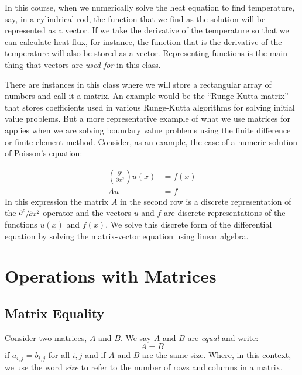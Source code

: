 In this course, when we numerically solve the heat equation to find temperature, say, in a cylindrical rod, the function that we find as the solution will be represented as a vector. If we take the derivative of the temperature so that we can calculate heat flux, for instance, the function that is the derivative of the temperature will also be stored as a vector.  Representing functions is the main thing that vectors are \emph{used for} in this class.

There are instances in this class where we will store a rectangular array of numbers and call it a matrix.  An example would be the ``Runge-Kutta matrix'' that stores coefficients used in various Runge-Kutta algorithms for solving initial value problems.  But a more representative example of what we use matrices for applies when we are solving boundary value problems using the finite difference or finite element method.  Consider, as an example, the case of a numeric solution of Poisson's equation:

\begin{align*}
\left(\frac{\partial^2 }{\partial x^2} \right)u(x) &= f(x) \\
Au &= f
\end{align*} 
In this expression the matrix $A$ in the second row is a discrete representation of the $\sfrac{\partial^2 }{\partial x^2}$ operator and the vectors $u$ and $f$ are discrete representations of the functions $u(x)$ and $f(x)$.  We solve this discrete form of the differential equation by solving the matrix-vector equation using linear algebra.


\section{Operations with Matrices}

\subsection{Matrix Equality}
Consider two matrices, $A$ and $B$.  We say $A$ and $B$ are \emph{equal} and write:
\begin{equation*}
A = B
\end{equation*}
if $a_{i,j} = b_{i,j}$ for all $i,j$ and if $A$ and $B$ are the same size.  Where, in this context, we use the word \emph{size} to refer to the number of rows and columns in a matrix.


